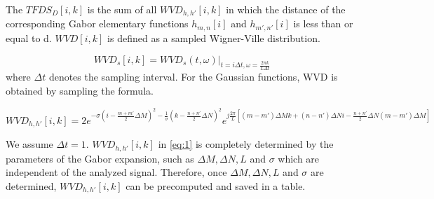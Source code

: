 The $TFDS_D[i,k]$ is the sum of all $WVD_{h,h'}[i,k]$ in which the distance of the corresponding Gabor elementary functions $h_{m,n}[i]$ and $h_{m',n'}[i]$ is less than or equal to d. $WVD[i,k]$ is defined as a sampled Wigner-Ville distribution. 

\begin{equation}
WVD_s[i,k] = WVD_s(t,\omega) |_{ t=i\Delta t, \omega = \frac{2\pi k}{L\Delta t}}
\end{equation}
where $\Delta t$ denotes the sampling interval. For the Gaussian functions, WVD is obtained by sampling the formula. 

\begin{equation} \label{eq:1}
WVD_{h,h'}[i,k] = 2e^{-\sigma(i-\frac{m+m'}{2}\Delta M)^2-\frac{1}{\sigma}(k-\frac{n+n'}{2}\Delta N)^2} e^{j\frac{2\pi}{L}[(m-m')\Delta M k +(n-n')\Delta Ni - \frac{n+n'}{2}\Delta N(m-m')\Delta M]}
\end{equation}

We assume $\Delta t =1$. $WVD_{h,h'}[i,k]$ in \ref{eq:1} is completely determined by the parameters of the Gabor expansion, such as $\Delta M, \Delta N, L$ and $\sigma$ which are independent of the analyzed signal. Therefore, once $\Delta M, \Delta N, L$ and $\sigma$ are determined, $WVD_{h,h'}[i,k]$ can be precomputed and saved in a table. 

